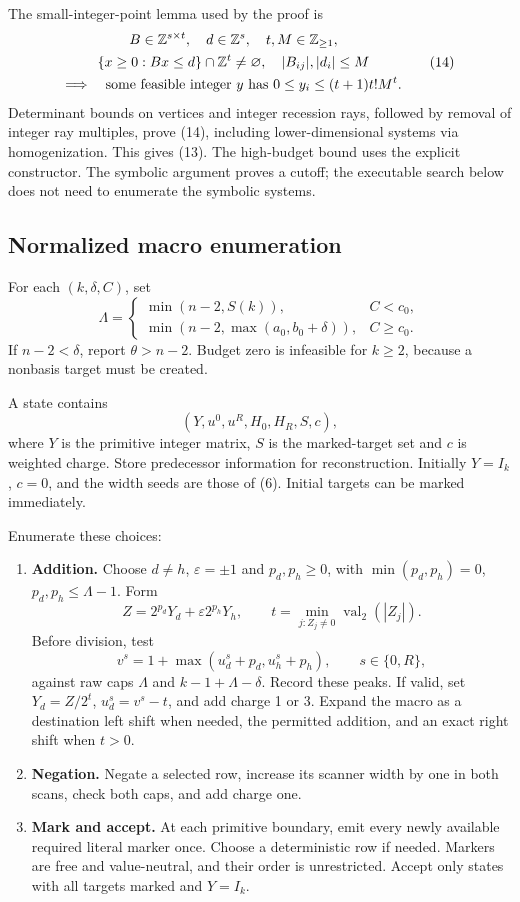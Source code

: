 \documentclass[11pt,letterpaper]{article}
\newcommand{\val}{\operatorname{val}_2}
\begin{document}
The small-integer-point lemma used by the proof is
\[
\begin{gathered}
 B\in\mathbb Z^{s\times t},\quad d\in\mathbb Z^s,\quad t,M\in\mathbb Z_{\ge1},\\
\{x\ge0:Bx\le d\}\cap\mathbb Z^t\ne\varnothing,\quad
 |B_{ij}|,|d_i|\le M\\
\Longrightarrow\quad
\text{some feasible integer }y\text{ has }
0\le y_i\le(t+1)t!M^t.
\end{gathered}\tag{14}
\]
Determinant bounds on vertices and integer recession rays, followed
by removal of integer ray multiples, prove (14), including
lower-dimensional systems via homogenization.
This gives (13). The high-budget bound uses the explicit constructor.
The symbolic argument proves a cutoff; the executable search below
does not need to enumerate the symbolic systems.

\subsection{Normalized macro enumeration}
For each \((k,\delta,C)\), set
\[
\Lambda=
\begin{cases}
\min(n-2,S(k)),&C<c_0,\\
\min(n-2,\max(a_0,b_0+\delta)),&C\ge c_0.
\end{cases}\tag{15}
\]
If \(n-2<\delta\), report \(\theta>n-2\).
Budget zero is infeasible for \(k\ge2\), because a nonbasis target
must be created.

A state contains
\[
(Y,u^0,u^R,H_0,H_R,S,c),
\tag{16}
\]
where \(Y\) is the primitive integer matrix, \(S\) is the marked-target
set and \(c\) is weighted charge. Store predecessor information for
reconstruction. Initially \(Y=I_k\), \(c=0\), and the width seeds are
those of (6). Initial targets can be marked immediately.

Enumerate these choices:
\begin{enumerate}
\item \textbf{Addition.} Choose \(d\ne h\), \(\varepsilon=\pm1\)
and \(p_d,p_h\ge0\), with
\(\min(p_d,p_h)=0\), \(p_d,p_h\le\Lambda-1\). Form
\[
Z=2^{p_d}Y_d+\varepsilon2^{p_h}Y_h,\qquad
t=\min_{j:Z_j\ne0}\val(|Z_j|).
\]
Before division, test
\[
v^s=1+\max(u_d^s+p_d,u_h^s+p_h),\qquad s\in\{0,R\},
\]
against raw caps \(\Lambda\) and \(k-1+\Lambda-\delta\).
Record these peaks. If valid, set
\(Y_d=Z/2^t\), \(u_d^s=v^s-t\), and add charge 1 or 3.
Expand the macro as a destination left shift when needed, the
permitted addition, and an exact right shift when \(t>0\).

\item \textbf{Negation.} Negate a selected row, increase its scanner
width by one in both scans, check both caps, and add charge one.

\item \textbf{Mark and accept.} At each primitive boundary, emit
every newly available required literal marker once.
Choose a deterministic row if needed.
Markers are free and value-neutral, and their order is unrestricted.
Accept only states with all targets marked and \(Y=I_k\).
\end{enumerate}
\end{document}
